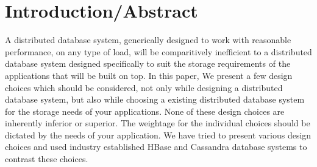 \section{Introduction/Abstract}

A distributed database system, generically designed to work with reasonable performance, on any type of load, will be comparitively inefficient to a distributed database system designed specifically to suit the storage requirements of the applications that will be built on top. In this paper, We present a few design choices which should be considered, not only while designing a distributed database system, but also while choosing a existing distributed database system for the storage needs of your applications. None of these design choices are inherently inferior or superior. The weightage for the individual choices should be dictated by the needs of your application. We have tried to present various design choices and used industry established HBase and Cassandra database systems to contrast these choices.